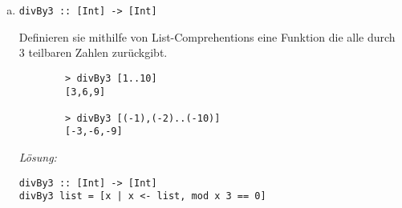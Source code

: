 \documentclass{article}
\begin{document}
\begin{enumerate} [a)]
\begin{verbatim}
        > take 5 (repeat 'a')
        "aaaaa"

        > take 2 (repeat [])
        [[],[]]
    \end{verbatim}
    \textit{Lösung:}
    \begin{mdframed}[backgroundcolor=bg]
        \begin{verbatim}
repeat :: a -> [a]
repeat x = x : repeat x
        \end{verbatim}
    \end{mdframed}

    \item \begin{verbatim}
divBy3 :: [Int] -> [Int]
          \end{verbatim}
    Definieren sie mithilfe von List-Comprehentions eine Funktion die alle durch 3 teilbaren Zahlen zurückgibt.
    \begin{verbatim}
        > divBy3 [1..10]
        [3,6,9]
       
        > divBy3 [(-1),(-2)..(-10)]
        [-3,-6,-9]
    \end{verbatim}
    \textit{Lösung:}
    \begin{mdframed}[backgroundcolor=bg]
        \begin{verbatim}
divBy3 :: [Int] -> [Int]
divBy3 list = [x | x <- list, mod x 3 == 0]
        \end{verbatim}
    \end{mdframed}

\end{enumerate}
\end{document}
